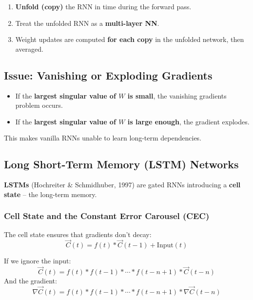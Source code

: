 \documentclass[11pt,a4paper]{article}
\newcommand{\vC}{\vec{C}}
\begin{document}
\begin{tcolorbox}[colback=boxgray, colframe=leidenblue, title=\textbf{BPTT}]
\begin{enumerate}[leftmargin=*]
    \item \textbf{Unfold (copy)} the RNN in time during the forward pass.
    \item Treat the unfolded RNN as a \textbf{multi-layer NN}.
    \item Weight updates are computed \textbf{for each copy} in the unfolded network, then averaged.
\end{enumerate}
\end{tcolorbox}

\subsection{Issue: Vanishing or Exploding Gradients}

\begin{warningbox}
\begin{itemize}[leftmargin=*]
    \item If the \textbf{largest singular value of $W$ is small}, the vanishing gradients problem occurs.
    \item If the \textbf{largest singular value of $W$ is large enough}, the gradient explodes.
\end{itemize}
\end{warningbox}

This makes vanilla RNNs unable to learn long-term dependencies.

\subsection{Long Short-Term Memory (LSTM) Networks}

\begin{keybox}
\textbf{LSTMs} (Hochreiter \& Schmidhuber, 1997) are gated RNNs introducing a \textbf{cell state} -- the long-term memory.
\end{keybox}

\subsubsection{Cell State and the Constant Error Carousel (CEC)}

The cell state ensures that gradients don't decay:
\[
\vC(t) = f(t) * \vC(t-1) + \text{Input}(t)
\]

If we ignore the input:
\[
\vC(t) = f(t) * f(t-1) * \cdots * f(t-n+1) * \vC(t-n)
\]
And the gradient:
\[
\nabla \vC(t) = f(t) * f(t-1) * \cdots * f(t-n+1) * \nabla \vC(t-n)
\]
\end{document}
